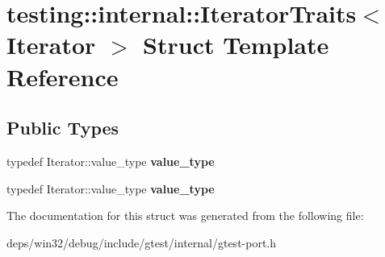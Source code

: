 \hypertarget{structtesting_1_1internal_1_1_iterator_traits}{}\section{testing\+:\+:internal\+:\+:Iterator\+Traits$<$ Iterator $>$ Struct Template Reference}
\label{structtesting_1_1internal_1_1_iterator_traits}
\subsection*{Public Types}
\begin{DoxyCompactItemize}
\item 
\hypertarget{structtesting_1_1internal_1_1_iterator_traits_a29de4320a9c53ce438d3561b94e515bb}{}typedef Iterator\+::value\+\_\+type {\bfseries value\+\_\+type}\label{structtesting_1_1internal_1_1_iterator_traits_a29de4320a9c53ce438d3561b94e515bb}

\item 
\hypertarget{structtesting_1_1internal_1_1_iterator_traits_a29de4320a9c53ce438d3561b94e515bb}{}typedef Iterator\+::value\+\_\+type {\bfseries value\+\_\+type}\label{structtesting_1_1internal_1_1_iterator_traits_a29de4320a9c53ce438d3561b94e515bb}

\end{DoxyCompactItemize}


The documentation for this struct was generated from the following file\+:\begin{DoxyCompactItemize}
\item 
deps/win32/debug/include/gtest/internal/gtest-\/port.\+h\end{DoxyCompactItemize}
